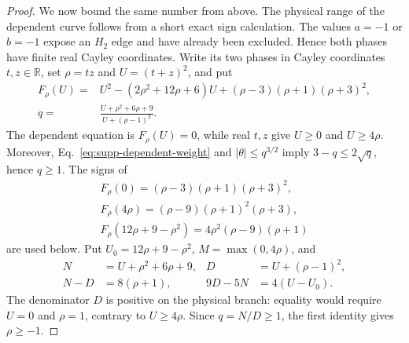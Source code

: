 \documentclass[aps,prx,reprint,nofootinbib,twoside,superscriptaddress,longbibliography,floatfix]{revtex4-2}
\theoremstyle{definition}
\begin{document}
\begin{proof}
We now bound the same number from above.  The physical range of the dependent curve follows from a short exact sign calculation.  {The values $a=-1$ or $b=-1$ expose an $H_2$ edge and have already been excluded. Hence both phases have finite real Cayley coordinates.} Write its two phases in Cayley coordinates $t,z\in\mathbb R$, set $\rho=tz$ and $U=(t+z)^2$, and put
\begin{equation}
\begin{aligned}
F_\rho(U)={}&U^2-(2\rho^2+12\rho+6)U
 +(\rho-3)(\rho+1)(\rho+3)^2,\\
q={}&\frac{U+\rho^2+6\rho+9}{U+(\rho-1)^2}.
\end{aligned}
\label{eq:supp-dependent-cayley}
\end{equation}
The dependent equation is $F_\rho(U)=0$, while real $t,z$ give $U\geq0$ and $U\geq4\rho$.  Moreover, Eq.~\eqref{eq:supp-dependent-weight} and $|\theta|\le q^{3/2}$ imply $3-q\le2\sqrt q$, hence $q\ge1$. The signs of
\begin{equation}
\begin{gathered}
F_\rho(0)=(\rho-3)(\rho+1)(\rho+3)^2,\\
F_\rho(4\rho)=(\rho-9)(\rho+1)^2(\rho+3),\\
F_\rho(12\rho+9-\rho^2)=4\rho^2(\rho-9)(\rho+1)
\end{gathered}
\label{eq:supp-dependent-sign-table}
\end{equation}
are used below. Put $U_0=12\rho+9-\rho^2$, $M=\max(0,4\rho)$, and
\begin{equation}
\begin{aligned}
N&=U+\rho^2+6\rho+9,&
D&=U+(\rho-1)^2,\\
N-D&=8(\rho+1),&
9D-5N&=4(U-U_0).
\end{aligned}
\label{eq:supp-dependent-range-identities}
\end{equation}
The denominator $D$ is positive on the physical branch: equality would require $U=0$ and $\rho=1$, contrary to $U\ge4\rho$. Since $q=N/D\ge1$, the first identity gives $\rho\ge-1$.


\end{proof}
\end{document}
